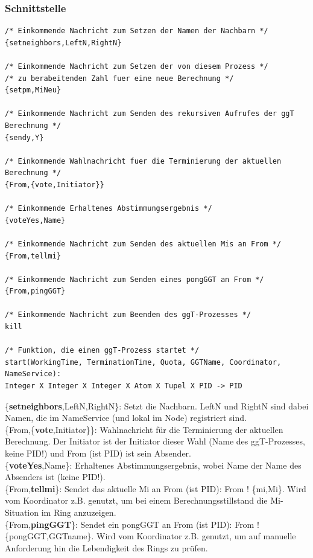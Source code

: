\documentclass{article}
\begin{document}
\subsubsection{Schnittstelle}
\begin{lstlisting}
/* Einkommende Nachricht zum Setzen der Namen der Nachbarn */
{setneighbors,LeftN,RightN}

/* Einkommende Nachricht zum Setzen der von diesem Prozess */
/* zu berabeitenden Zahl fuer eine neue Berechnung */
{setpm,MiNeu}

/* Einkommende Nachricht zum Senden des rekursiven Aufrufes der ggT Berechnung */
{sendy,Y}

/* Einkommende Wahlnachricht fuer die Terminierung der aktuellen Berechnung */
{From,{vote,Initiator}}

/* Einkommende Erhaltenes Abstimmungsergebnis */
{voteYes,Name}

/* Einkommende Nachricht zum Senden des aktuellen Mis an From */
{From,tellmi}

/* Einkommende Nachricht zum Senden eines pongGGT an From */
{From,pingGGT}

/* Einkommende Nachricht zum Beenden des ggT-Prozesses */
kill

/* Funktion, die einen ggT-Prozess startet */
start(WorkingTime, TerminationTime, Quota, GGTName, Coordinator, NameService):
Integer X Integer X Integer X Atom X Tupel X PID -> PID
\end{lstlisting}
\{\textbf{setneighbors},LeftN,RightN\}: Setzt die Nachbarn. LeftN und RightN sind dabei Namen, die im NameService
(und lokal im Node) registriert sind.\\

\{From,\{\textbf{vote},Initiator\}\}: Wahlnachricht für die Terminierung der aktuellen Berechnung. Der Initiator ist der
Initiator dieser Wahl (Name des ggT-Prozesses, keine PID!) und From (ist PID) ist sein Absender.\\

\{\textbf{voteYes},Name\}: Erhaltenes Abstimmungsergebnis, wobei Name der Name des Absenders ist (keine PID!).\\

\{From,\textbf{tellmi}\}: Sendet das aktuelle Mi an From (ist PID): From ! \{mi,Mi\}. Wird vom Koordinator z.B. genutzt,
um bei einem Berechnungsstillstand die Mi-Situation im Ring anzuzeigen.\\

\{From,\textbf{pingGGT}\}: Sendet ein pongGGT an From (ist PID): From ! \{pongGGT,GGTname\}. Wird vom Koordinator z.B.
genutzt, um auf manuelle Anforderung hin die Lebendigkeit des Rings zu prüfen.\\
\end{document}
